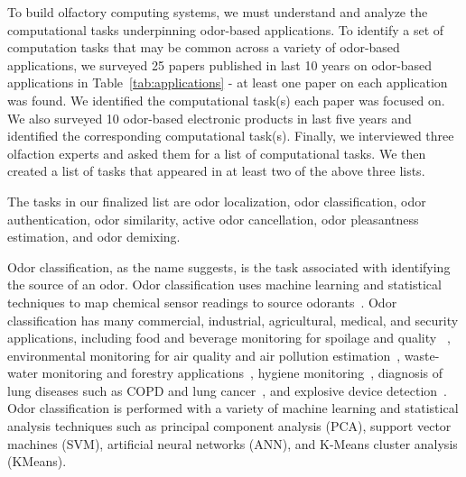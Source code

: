 To build 
olfactory computing systems, we must understand and analyze
the computational tasks underpinning odor-based applications. To identify a set of computation tasks that may be common across
a variety of odor-based applications, we surveyed 25 papers published in last 10 years on odor-based applications in Table~\ref{tab:applications} - at least one paper on each application was found. We identified the computational task(s) each paper was focused on. We also surveyed 10 odor-based electronic products in last five years and identified the corresponding computational task(s). Finally, we interviewed three olfaction experts and asked them for a list of computational tasks. We then created a list of tasks that appeared in at least two of the above three lists.

The tasks in our finalized list are
odor localization, odor classification, odor authentication, odor similarity,
active odor cancellation, odor pleasantness estimation, and odor demixing.

Odor classification, as the name suggests, is the task associated with
identifying the source of an odor.  Odor classification uses machine learning
and statistical techniques to map chemical sensor readings to source
odorants~\cite{kaeppler2013odor, husni2017odor}. Odor classification has many
commercial, industrial, agricultural, medical, and security applications,
including food and beverage monitoring for spoilage and quality 
~\cite{yu2008quality, pan2014early},
environmental monitoring for air quality and air pollution
estimation~\cite{caron2019identification, szulczynski2017different,
tacstan2019real, de2008tinynose}, 
waste-water monitoring and forestry applications~\cite{wilson2013diverse,
blanco2018development, lagod2019application, dewettinck2001electronic},
hygiene
monitoring~\cite{lorwongtragool2014novel}, diagnosis of lung diseases such
as COPD and lung cancer~\cite{gardner2000electronic, va2021noninvasive,
binson2021discrimination, d2010investigation},
and explosive device detection~\cite{brudzewski2012metal, lopez2017electronic,
sun2013liquid}. Odor classification is performed with a variety of machine
learning and statistical analysis techniques such as principal component
analysis (PCA), support vector machines (SVM), artificial neural networks
(ANN), and K-Means cluster analysis (KMeans).


